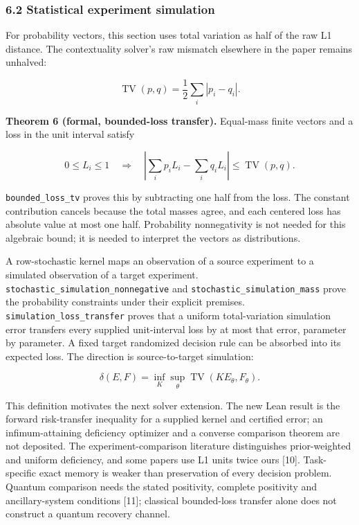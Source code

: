 \documentclass[
  10pt,
]{article}
\begin{document}
\subsubsection{6.2 Statistical experiment simulation}\label{statistical-experiment-simulation}

For probability vectors, this section uses total variation as half of the raw L1 distance. The contextuality solver's raw mismatch elsewhere in the paper remains unhalved:

\protect\hypertarget{math-E0046-0047}{}{\[
\operatorname{TV}(p,q)=\frac12\sum_i|p_i-q_i|.
\]}

\textbf{Theorem 6 (formal, bounded-loss transfer).} Equal-mass finite vectors and a loss in the unit interval satisfy

\protect\hypertarget{math-E0044-0048}{}{\[
0\le L_i\le1\quad\Longrightarrow\quad
\left|\sum_i p_i L_i-\sum_i q_i L_i\right|
\le\operatorname{TV}(p,q).
\]}

\texttt{bounded\_loss\_tv} proves this by subtracting one half from the loss. The constant contribution cancels because the total masses agree, and each centered loss has absolute value at most one half. Probability nonnegativity is not needed for this algebraic bound; it is needed to interpret the vectors as distributions.

A row-stochastic kernel maps an observation of a source experiment to a simulated observation of a target experiment. \texttt{stochastic\_simulation\_nonnegative} and \texttt{stochastic\_simulation\_mass} prove the probability constraints under their explicit premises. \texttt{simulation\_loss\_transfer} proves that a uniform total-variation simulation error transfers every supplied unit-interval loss by at most that error, parameter by parameter. A fixed target randomized decision rule can be absorbed into its expected loss. The direction is source-to-target simulation:

\protect\hypertarget{math-E0045-0049}{}{\[
\delta(E,F)=\inf_K\sup_\theta
\operatorname{TV}(K E_\theta,F_\theta).
\]}

This definition motivates the next solver extension. The new Lean result is the forward risk-transfer inequality for a supplied kernel and certified error; an infimum-attaining deficiency optimizer and a converse comparison theorem are not deposited. The experiment-comparison literature distinguishes prior-weighted and uniform deficiency, and some papers use L1 units twice ours {[}10{]}. Task-specific exact memory is weaker than preservation of every decision problem. Quantum comparison needs the stated positivity, complete positivity and ancillary-system conditions {[}11{]}; classical bounded-loss transfer alone does not construct a quantum recovery channel.
\end{document}
